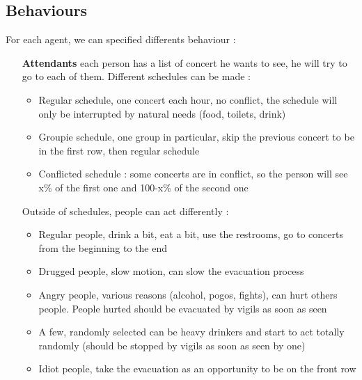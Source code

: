 \subsection{Behaviours}
For each agent, we can specified differents behaviour :\\

\begin{itemize}
	\item[{\bf Attendants}] each person has a list of concert he wants to see,
	he will try to go to each of them. Different schedules can be made :\\
	
		\begin{itemize}
			\item Regular schedule, one concert each hour, no conflict, the
			schedule will only be interrupted by natural needs (food, toilets,
			drink)
			\item Groupie schedule, one group in particular, skip the previous
			concert to be in the first row, then regular schedule
			\item Conflicted schedule : some concerts are in conflict, so the
			person will see x\% of the first one and 100-x\% of the second one
		\end{itemize}


 	Outside of schedules, people can act differently :\\
		
		\begin{itemize}
			\item Regular people, drink a bit, eat a bit, use the restrooms, go
			to concerts from the beginning to the end
			\item Drugged people, slow motion, can slow the evacuation process
			\item Angry people, various reasons (alcohol, pogos, fights), can
			hurt others people. People hurted should be evacuated by vigils as
			soon as seen
			\item A few, randomly selected can be heavy drinkers and start to
			act totally randomly (should be stopped by vigils as soon as seen by
			one)
			\item Idiot people, take the evacuation as an opportunity to be on
			the front row
		\end{itemize}


\end{itemize}
